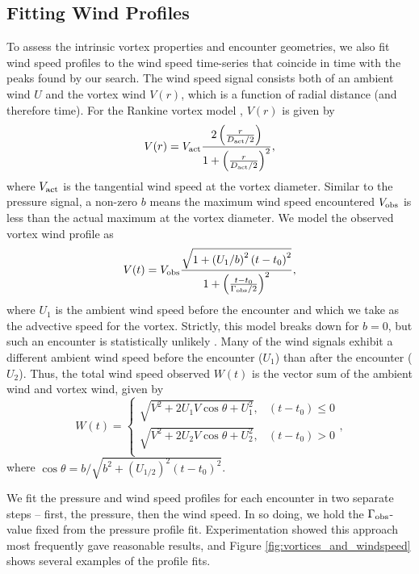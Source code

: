 \documentclass{aastex63}
\begin{document}
\subsection{Fitting Wind Profiles}
\label{sec:Pressure and Wind Models}
To assess the intrinsic vortex properties and encounter geometries, we also fit wind speed profiles to the wind speed time-series that coincide in time with the peaks found by our search. The wind speed signal consists both of an ambient wind $U$ and the vortex wind $V(r)$, which is a function of radial distance (and therefore time). For the Rankine vortex model \citep{1991ExFl...11...73V}, $V(r)$ is given by
\begin{equation}
    V(r) = V_{\rm act} \frac{2 \left( \frac{r}{D_{\rm act}/2} \right) }{1 + \left( \frac{r}{D_{\rm act}/2} \right)^2},
\end{equation}
where $V_{\rm act}$ is the tangential wind speed at the vortex diameter. Similar to the pressure signal, a non-zero $b$ means the maximum wind speed encountered $V_{\rm obs}$ is less than the actual maximum at the vortex diameter. We model the observed vortex wind profile as
\begin{equation}
    V(t) = V_{\rm obs} \frac{\sqrt{1 + \left( U_1/b \right)^2 \left( t - t_0 \right)^2}}{1 + \left(\frac{t - t_0}{\Gamma_{\rm obs}/2}\right)^2},\label{eqn:wind_profile}
\end{equation}
where $U_1$ is the ambient wind speed before the encounter and which we take as the advective speed for the vortex. Strictly, this model breaks down for $b = 0$, but such an encounter is statistically unlikely \citep{2018Icar..299..166J}. Many of the wind signals exhibit a different ambient wind speed before the encounter ($U_1$) than after the encounter ($U_2$). Thus, the total wind speed observed $W(t)$ is the vector sum of the ambient wind and vortex wind, given by 
\begin{equation}
    W(t) = \left\{
    \begin{array}{ll}
            \sqrt{V^2 + 2 U_1 V \cos \theta + U_1^2}, & \left( t - t_0 \right) \leq 0\\
            \sqrt{V^2 + 2 U_2 V \cos \theta + U_2^2}, & \left( t - t_0 \right) > 0\\
    \end{array},\label{eqn:total_wind_speed}
\end{equation}
where $\cos \theta = b/\sqrt{b^2 + \left( U_{1/2} \right)^2\left( t - t_0 \right)^2}$. 

We fit the pressure and wind speed profiles for each encounter in two separate steps -- first, the pressure, then the wind speed. In so doing, we hold the $\Gamma_{\rm obs}$-value fixed from the pressure profile fit. Experimentation showed this approach most frequently gave reasonable results, and Figure \ref{fig:vortices_and_windspeed} shows several examples of the profile fits. 
\end{document}
